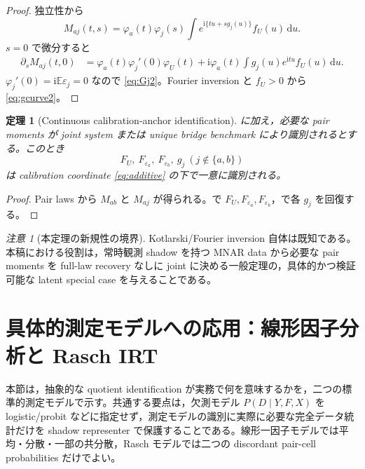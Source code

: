 \documentclass[11pt,a4paper]{ltjsarticle}
\newtheorem{theorem}{定理}[section]
\theoremstyle{remark}
\newtheorem{remark}{注意}[section]
\newcommand{\E}{\mathbb E}
\newcommand{\dd}{\,\mathrm d}
\newcommand{\ii}{\mathrm i}
\begin{document}
\begin{proof}
独立性から
\[
M_{aj}(t,s)
=\varphi_a(t)\varphi_j(s)
\int e^{\ii\{tu+sg_j(u)\}}f_U(u)\dd u.
\]
$s=0$ で微分すると
\begin{align*}
\partial_sM_{aj}(t,0)
&=\varphi_a(t)\varphi_j'(0)\varphi_U(t)
+\ii\varphi_a(t)\int g_j(u)e^{\ii tu}f_U(u)\dd u.
\end{align*}
$\varphi_j'(0)=\ii\E\varepsilon_j=0$ なので \eqref{eq:Gj2}。Fourier inversion と $f_U>0$ から \eqref{eq:gcurve2}。
\end{proof}

\begin{theorem}[Continuous calibration-anchor identification]\label{thm:continuousanchor}
に加え，必要な pair moments が joint system または unique bridge benchmark により識別されるとする。このとき
\[
F_U,\ F_{\varepsilon_a},\ F_{\varepsilon_b},\ g_j\ (j\notin\{a,b\})
\]
は calibration coordinate \eqref{eq:additive} の下で一意に識別される。
\end{theorem}

\begin{proof}
Pair laws から $M_{ab}$ と $M_{aj}$ が得られる。で $F_U,F_{\varepsilon_a},F_{\varepsilon_b}$，で各 $g_j$ を回復する。
\end{proof}

\begin{remark}[本定理の新規性の境界]
Kotlarski/Fourier inversion 自体は既知である。本稿における役割は，常時観測 shadow を持つ MNAR data から必要な pair moments を full-law recovery なしに joint に決める一般定理の，具体的かつ検証可能な latent special case を与えることである。
\end{remark}

\section{具体的測定モデルへの応用：線形因子分析と Rasch IRT}\label{sec:factorrasch}

本節は，抽象的な quotient identification が実務で何を意味するかを，二つの標準的測定モデルで示す。共通する要点は，欠測モデル
\(P(D\mid Y,F,X)\) を logistic/probit などに指定せず，測定モデルの識別に実際に必要な完全データ統計だけを shadow representer で保護することである。線形一因子モデルでは平均・分散・一部の共分散，Rasch モデルでは二つの discordant pair-cell probabilities だけでよい。
\end{document}
